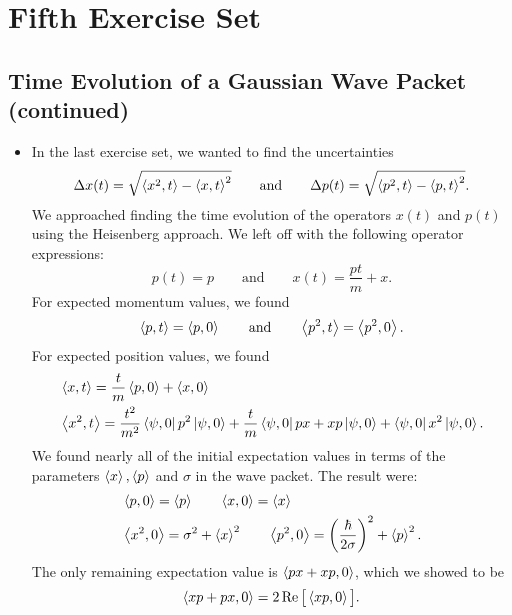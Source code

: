 \documentclass[11pt, a4paper]{article}
\newcommand{\eqtext}[1]{\qquad \text{#1} \qquad}
\begin{document}
\begin{itemize}
\end{itemize}


\section{Fifth Exercise Set}

\subsection{Time Evolution of a Gaussian Wave Packet (continued)}
\begin{itemize}
	\item In the last exercise set, we wanted to find the uncertainties
	\begin{equation*}
		\Delta x(t) = \sqrt{\ev{x^{2}, t} - \ev{x, t}^{2}} \eqtext{and} \Delta p(t) = \sqrt{\ev{p^{2}, t} - \ev{p, t}^{2}}.
	\end{equation*}
	We approached finding the time evolution of the operators $ x(t) $ and $ p(t) $ using the Heisenberg approach. We left off with the following operator expressions:
	\begin{equation*}
		p(t) = p \eqtext{and} x(t) = \frac{pt}{m} + x.
	\end{equation*}
	For expected momentum values, we found
	\begin{equation*}
		\ev{p, t} = \ev{p, 0} \eqtext{and} \ev{p^{2}, t} = \ev{p^{2}, 0}.
	\end{equation*}
	For expected position values, we found
	\begin{align*}
		&\ev{x, t} = \frac{t}{m} \ev{p, 0} + \ev{x, 0}\\
		&\ev{x^{2}, t} = \frac{t^{2}}{m^{2}}\bra{\psi, 0} p^{2} \ket{\psi, 0} + \frac{t}{m}\bra{\psi, 0} px + xp \ket{\psi, 0} + \bra{\psi, 0} x^{2} \ket{\psi, 0}.
	\end{align*}
	We found nearly all of the initial expectation values in terms of the parameters $ \ev{x}, \ev{p} $ and $ \sigma $ in the wave packet. The result were:
	\begin{align*}
		&\ev{p, 0} = \ev{p} \qquad \ev{x, 0} = \ev{x}\\
		&\ev{x^{2}, 0} = \sigma^{2} + \ev{x}^{2} \qquad \ev{p^{2}, 0} = \left(\frac{\hbar}{2\sigma}\right)^{2} + \ev{p}^{2}.
	\end{align*}
	The only remaining expectation value is $ \ev{px + xp, 0} $, which we showed to be
	\begin{equation*}
		\ev{xp + px, 0} = 2\Re \big[\ev{xp, 0}\big].
	\end{equation*}

\end{itemize}
\end{document}
